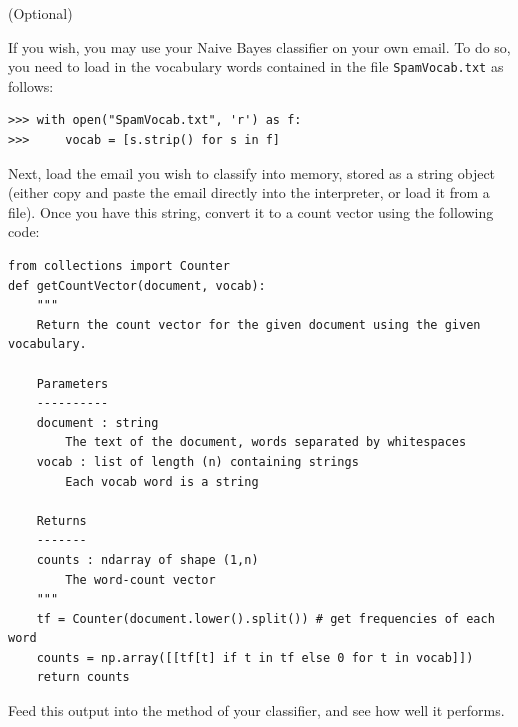 \begin{problem}
(Optional)

If you wish, you may use your Naive Bayes classifier on your own email.
To do so, you need to load in the vocabulary words contained in the file {\tt SpamVocab.txt} as follows:
\begin{lstlisting}
>>> with open("SpamVocab.txt", 'r') as f:
>>>     vocab = [s.strip() for s in f]
\end{lstlisting}
Next, load the email you wish to classify into memory, stored as a string object (either copy and paste the email
directly into the interpreter, or load it from a file). Once you have this string, convert it to a count vector using
the following code:
\begin{lstlisting}
from collections import Counter
def getCountVector(document, vocab):
    """
    Return the count vector for the given document using the given vocabulary.

    Parameters
    ----------
    document : string
		The text of the document, words separated by whitespaces
    vocab : list of length (n) containing strings
		Each vocab word is a string

    Returns
    -------
    counts : ndarray of shape (1,n)
		The word-count vector
    """
    tf = Counter(document.lower().split()) # get frequencies of each word
    counts = np.array([[tf[t] if t in tf else 0 for t in vocab]])
    return counts
\end{lstlisting}
Feed this output into the  method of your classifier, and see how well it performs.
\end{problem}


